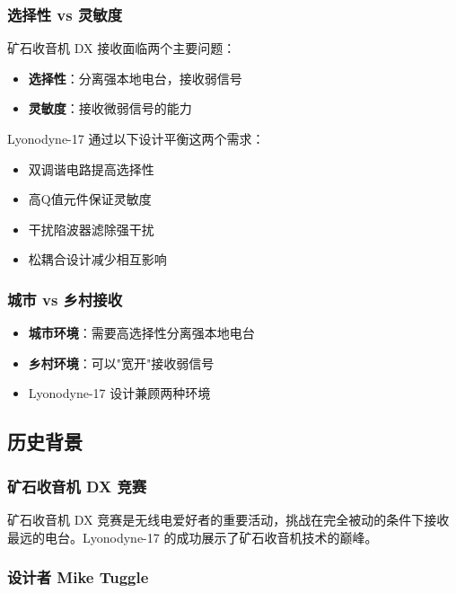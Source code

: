 \subsubsection*{选择性 vs 灵敏度}

矿石收音机 DX 接收面临两个主要问题：
\begin{itemize}[leftmargin=2cm]
    \item \textbf{选择性}：分离强本地电台，接收弱信号
    \item \textbf{灵敏度}：接收微弱信号的能力
\end{itemize}

Lyonodyne-17 通过以下设计平衡这两个需求：
\begin{itemize}[leftmargin=2cm]
    \item 双调谐电路提高选择性
    \item 高Q值元件保证灵敏度
    \item 干扰陷波器滤除强干扰
    \item 松耦合设计减少相互影响
\end{itemize}

\subsubsection*{城市 vs 乡村接收}

\begin{itemize}[leftmargin=2cm]
    \item \textbf{城市环境}：需要高选择性分离强本地电台
    \item \textbf{乡村环境}：可以"宽开"接收弱信号
    \item Lyonodyne-17 设计兼顾两种环境
\end{itemize}

\subsection{历史背景}
\label{subsec:lyonodyne_history}

\subsubsection*{矿石收音机 DX 竞赛}

矿石收音机 DX 竞赛是无线电爱好者的重要活动，挑战在完全被动的条件下接收最远的电台。Lyonodyne-17 的成功展示了矿石收音机技术的巅峰。

\subsubsection*{设计者 Mike Tuggle}

